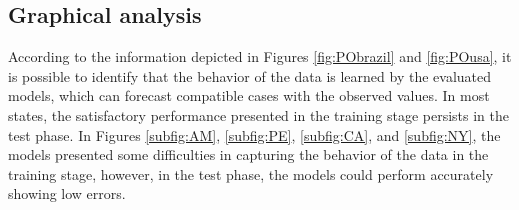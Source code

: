 \subsection{Graphical analysis}

According to the information depicted in Figures \ref{fig:PObrazil} and \ref{fig:POusa}, it is possible to identify that the behavior of the data is learned by the evaluated models, which can forecast compatible cases with the observed values. In most states, the satisfactory performance presented in the training stage persists in the test phase. In Figures \ref{subfig:AM}, \ref{subfig:PE}, \ref{subfig:CA}, and \ref{subfig:NY}, the models presented some difficulties in capturing the behavior of the data in the training stage, however, in the test phase, the models could perform accurately showing low errors. 

